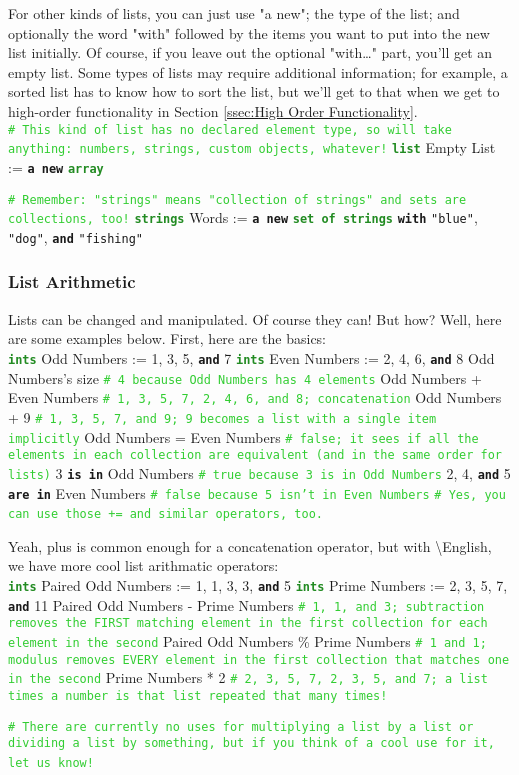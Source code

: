 \documentclass{article}
\newcommand{\English}{\textbackslash{}English}				%
\newcommand{\sssecl}[1]{\subsubsection{#1}\label{sssec:#1}}
\newcommand{\codecomment}[1]{\texttt{\textcolor{LimeGreen}{#1}}}
\newcommand{\commentline}[1]{\codecomment{\# #1}}
\newcommand{\type}[1]{\texttt{\textcolor{ForestGreen}{\textbf{#1}}}}
\newcommand{\common}[1]{\texttt{\textcolor{Mulberry}{\textbf{#1}}}}
\newcommand{\codestring}[1]{\texttt{\textcolor{NavyBlue}{"#1"}}}
\newenvironment{code}[0]
{\ttfamily{}				%
\setlength\parindent{0cm}	%
~\\}
{\setlength\parindent{1cm}
~\\}
\begin{document}
\indent For other kinds of lists, you can just use "a new"; the type of the list; and optionally the word "with" followed by the items you want to put into the new list initially. Of course, if you leave out the optional "with\ldots" part, you'll get an empty list. Some types of lists may require additional information; for example, a sorted list has to know how to sort the list, but we'll get to that when we get to high-order functionality in Section \ref{ssec:High Order Functionality}.
\begin{code}
\commentline{This kind of list has no declared element type, so will take anything: numbers, strings, custom objects, whatever!}
\type{list} Empty List := \common{a new} \type{array}

\commentline{Remember: "strings" means "collection of strings" and sets are collections, too!}
\type{strings} Words := \common{a new} \type{set of strings} \common{with} \codestring{blue}, \codestring{dog}, \common{and} \codestring{fishing}
\end{code}

\sssecl{List Arithmetic}
\indent Lists can be changed and manipulated. Of course they can! But how? Well, here are some examples below. First, here are the basics:
\begin{code}
\type{ints} Odd Numbers := 1, 3, 5, \common{and} 7
\type{ints} Even Numbers := 2, 4, 6, \common{and} 8
Odd Numbers's size \commentline{4 because Odd Numbers has 4 elements}
Odd Numbers + Even Numbers \commentline{1, 3, 5, 7, 2, 4, 6, and 8; concatenation}
Odd Numbers + 9 \commentline{1, 3, 5, 7, and 9; 9 becomes a list with a single item implicitly}
Odd Numbers = Even Numbers \commentline{false; it sees if all the elements in each collection are equivalent (and in the same order for lists)}
3 \common{is in} Odd Numbers \commentline{true because 3 is in Odd Numbers}
2, 4, \common{and} 5 \common{are in} Even Numbers \commentline{false because 5 isn't in Even Numbers}
\commentline{Yes, you can use those += and similar operators, too.}
\end{code}

\indent Yeah, plus is common enough for a concatenation operator, but with \English{}, we have more cool list arithmatic operators:
\begin{code}
\type{ints} Paired Odd Numbers := 1, 1, 3, 3, \common{and} 5
\type{ints} Prime Numbers := 2, 3, 5, 7, \common{and} 11
Paired Odd Numbers - Prime Numbers \commentline{1, 1, and 3; subtraction removes the FIRST matching element in the first collection for each element in the second}
Paired Odd Numbers \% Prime Numbers \commentline{1 and 1; modulus removes EVERY element in the first collection that matches one in the second}
Prime Numbers * 2 \commentline{2, 3, 5, 7, 2, 3, 5, and 7; a list times a number is that list repeated that many times!}

\commentline{There are currently no uses for multiplying a list by a list or dividing a list by something, but if you think of a cool use for it, let us know!}
\end{code}
\end{document}
